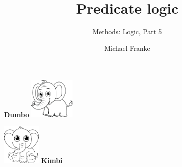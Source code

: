 \documentclass[fleqn,10pt,serif,xcolor=svgnames,xcolor=table,aspectratio=169,handout]{beamer}
\title{Predicate logic}
\subtitle{Methods: Logic, Part 5}
\author{Michael Franke}
\date{}
\begin{document}

\abovedisplayskip=3pt
\abovedisplayshortskip=3pt

\belowdisplayskip=3pt
\belowdisplayshortskip=3pt

\begin{frame}
  \maketitle
\end{frame}

\begin{frame}

  \bigskip

  \begin{minipage}{0.45\linewidth}
    \begin{center}
      \textcolor{themecolor}{\textbf{Dumbo}}
      \includegraphics[height=2cm]{pics/dumbo-elephant.png}
    \end{center}
  \end{minipage}
  \hfill
  \begin{minipage}{0.45\linewidth}
    \begin{center}
      \includegraphics[height=2cm]{pics/kimbi-elephant.png}
      \textcolor{themecolor}{\textbf{Kimbi}}
    \end{center}
  \end{minipage}

  \bigskip
  \bigskip
  \pause


\end{frame}
\end{document}
